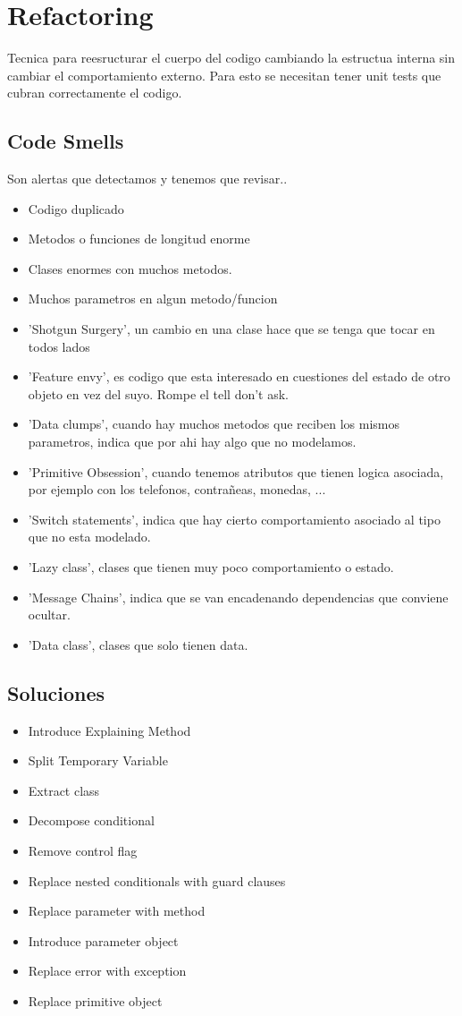\section{Refactoring}
Tecnica para reesructurar el cuerpo del codigo cambiando la estructua interna sin cambiar el comportamiento externo. Para esto se necesitan tener unit tests que cubran correctamente el codigo.

\subsection*{Code Smells}
Son alertas que detectamos y tenemos que revisar..
\begin{itemize}
\item Codigo duplicado
\item Metodos o funciones de longitud enorme
\item Clases enormes con muchos metodos.
\item Muchos parametros en algun metodo/funcion
\item 'Shotgun Surgery', un cambio en una clase hace que se tenga que tocar en todos lados
\item 'Feature envy',  es codigo que esta interesado en cuestiones del estado de otro objeto en vez del suyo. Rompe el tell don't ask.
\item 'Data clumps', cuando hay muchos metodos que reciben los mismos parametros, indica que por ahi hay algo que no modelamos.
\item 'Primitive Obsession', cuando tenemos atributos que tienen logica asociada, por ejemplo con los telefonos, contrañeas, monedas, ...
\item 'Switch statements', indica que hay cierto comportamiento asociado al tipo que no esta modelado.
\item 'Lazy class', clases que tienen muy poco comportamiento o estado.
\item 'Message Chains', indica que se van encadenando dependencias que conviene ocultar.
\item 'Data class', clases que solo tienen data.
\end{itemize}

\subsection*{Soluciones}
\begin{itemize}
\item Introduce Explaining Method
\item Split Temporary Variable
\item Extract class
\item Decompose conditional
\item Remove control flag
\item Replace nested conditionals with guard clauses
\item Replace parameter with method
\item Introduce parameter object
\item Replace error with exception
\item Replace primitive object
\end{itemize}